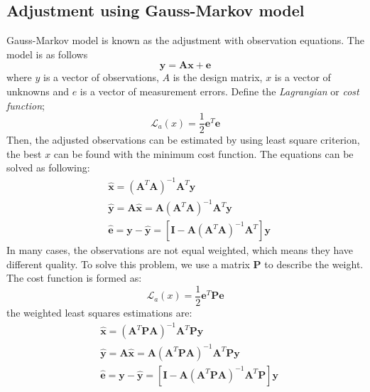 \subsection{Adjustment using Gauss-Markov model}
Gauss-Markov model is known as the adjustment with observation equations. The model is as follows
\begin{equation}
\bm{y} = \bm{A}\bm{x} + \bm{e}
\end{equation}
where $y$ is a vector of observations, $A$ is the design matrix, $x$ is a vector of unknowns and $e$ is a vector of measurement errors. Define the \textit{Lagrangian} or \textit{cost function};
\begin{equation}
\mathcal{L}_{a}(x) = \frac{1}{2} \bm{e}^T \bm{e}
\end{equation} 
Then, the adjusted observations can be estimated by using least square criterion, the best $x$ can be found with the minimum cost function. The equations can be solved as following:
\begin{align}
&\hat{\bm{x}} = (\bm{A}^T\bm{A})^{-1}\bm{A}^T\bm{y}\\
&\hat{\bm{y}} = \bm{A}\hat{\bm{x}} = \bm{A}(\bm{A}^T\bm{A})^{-1}\bm{A}^T\bm{y}\\
&\hat{\bm{e}} = \bm{y} - \hat{\bm{y}} = [\bm{I} - \bm{A}(\bm{A}^T\bm{A})^{-1}\bm{A}^T]\bm{y}
\end{align}
In many cases, the observations are not equal weighted, which means they have different quality. To solve this problem,  we use a matrix $\bm{P}$ to describe the weight. The cost function is formed as:
\begin{equation}
\mathcal{L}_{a}(x) = \frac{1}{2} \bm{e}^T \bm{P}\bm{e}
\end{equation}
the weighted least squares estimations are:
\begin{align}
&\hat{\bm{x}} = (\bm{A}^T \bm{P}\bm{A})^{-1}\bm{A}^T\bm{P}\bm{y}\\
&\hat{\bm{y}} = \bm{A}\hat{\bm{x}} = \bm{A}(\bm{A}^T\bm{P}\bm{A})^{-1}\bm{A}^T\bm{P}\bm{y}\\
&\hat{\bm{e}} = \bm{y} - \hat{\bm{y}} = [\bm{I} - \bm{A}(\bm{A}^T\bm{P}\bm{A})^{-1}\bm{A}^T\bm{P}]\bm{y}
\end{align}
